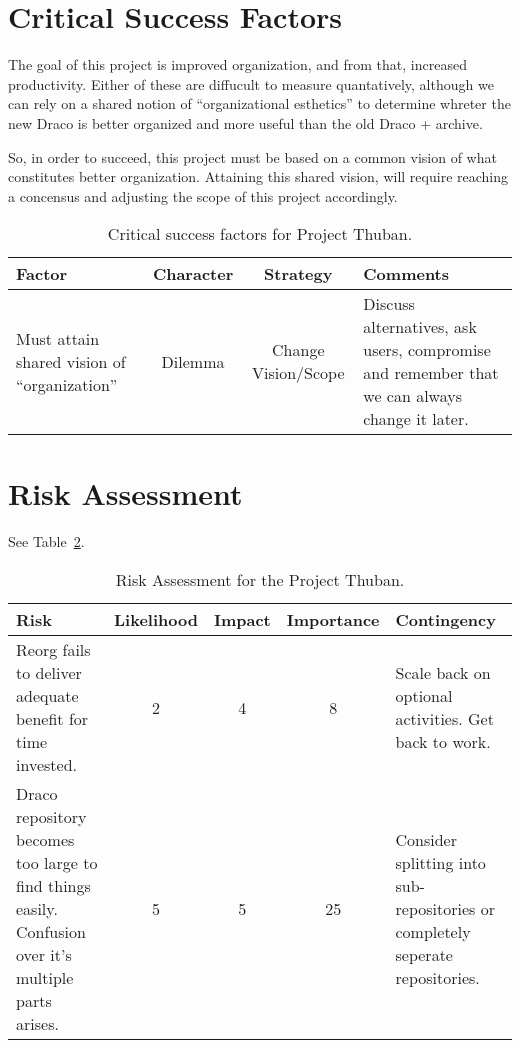 \documentclass[11pt]{ResearchNote}
\begin{document}
\section*{Critical Success Factors}

The goal of this project is improved organization, and from that,
increased productivity. Either of these are diffucult to measure
quantatively, although we can rely on a shared notion of
``organizational esthetics'' to determine whreter the new {\sf Draco}
is better organized and more useful than the old {\sf Draco} + {\sf
  archive}.

So, in order to succeed, this project must be based on a common vision
of what constitutes better organization. Attaining this shared vision,
will require reaching a concensus and adjusting the scope of this
project accordingly. 

\begin{table}[ht]
  \begin{center}
    \caption{Critical success factors for Project Thuban.}
    \label{tab:critical-success}
    \begin{tabular}{|p{4.5cm}|c|c|p{4.5cm}|} 
    \hline
    Factor             &  Character   & Strategy & Comments \\ 
    \hline\hline
    Must attain shared vision of ``organization'' & 
    Dilemma & Change Vision/Scope &
    Discuss alternatives, ask users, compromise and remember that we
    can always change it later. \\ \hline
    \end{tabular}
  \end{center}
\end{table}

\section*{Risk Assessment}

See Table~\ref{tab:risk}.

\begin{table}[ht]
  \begin{center}
    \caption{Risk Assessment for the Project Thuban.}
    \label{tab:risk}
    \begin{tabular}{|p{4.5cm}|c|c|c|p{4.5cm}|} 
    \hline
    Risk & Likelihood & Impact & Importance & Contingency \\
    \hline\hline
    Reorg fails to deliver adequate benefit for time invested. &
    2 & 4 & 8 & 
    Scale back on optional activities. Get back to  work. \\ \hline
    Draco repository becomes too large to find things
    easily. Confusion over it's multiple parts arises. & 
    5 & 5 & 25 &
    Consider splitting into sub-repositories or completely seperate
    repositories. \\ \hline
    \end{tabular}
  \end{center}
\end{table}
\end{document}

